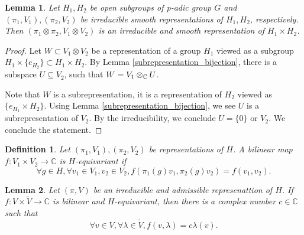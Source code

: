 \documentclass[8pt]{article}
\newtheorem{definition}{Definition}[section]
\newtheorem{lemma}{Lemma}[section]
\newcommand{\C}[0]{\mathbb{C}}
\newcommand{\tens}[1]{%
  \mathbin{\mathop{\otimes}\displaylimits_{#1}}%
}
\begin{document}
\begin{lemma}
  \label{lemma_irreducible_representations_tensor_product}
  Let $H_1,H_2$ be open subgroups of p-adic group $G$ and $(\pi_1,V_1),(\pi_2,V_2)$ be irreducible smooth representations of $H_1,H_2$, respectively.
  Then $(\pi_1\otimes\pi_2,V_1\otimes V_2)$ is an irreducible and smooth representation of $H_1\times H_2$.
\end{lemma}
\begin{proof}
  Let $W\subset V_1\otimes V_2$ be a representation of a group $H_1$ viewed as a subgroup $H_1\times\{e_{H_2}\}\subset H_1\times H_2$. 
  By Lemma \ref{subrepresentation_bijection}, there is a subspace $U\subseteq V_2$, such that $W=V_1\tens{\C}U$.
  \par Note that $W$ is a subrepresentation, it is a representation of $H_2$ viewed as $\{e_{H_1}\times H_2\}$. 
  Using Lemma \ref{subrepresentation_bijection}, we see $U$ is a subrepresentation of $V_2$. By the irreducibility, we conclude $U=\{0\}$ or $V_2$.
  We conclude the statement.
\end{proof}
\begin{definition}
  Let $(\pi_1,V_1),(\pi_2,V_2)$ be representations of $H$. A bilinear map $f:V_1\times V_2\to\C$ is $H$-equivariant if 
  \begin{equation*}
    \forall g\in H,\forall v_1\in V_1,v_2\in V_2, f(\pi_1(g)v_1,\pi_2(g)v_2) = f(v_1,v_2).
  \end{equation*}
\end{definition}
\begin{lemma}
  Let $(\pi,V)$ be an irreducible and admissible represenattion of $H$. If $f:V\times \widetilde{V}\to\C$ is bilinear and $H$-equivariant, then there is a complex number 
  $c\in \C$ such that 
  \begin{equation*}
    \forall v\in V,\forall \lambda\in\widetilde{V}, f(v,\lambda) = c\lambda(v).
  \end{equation*}
  \label{dimension_bilinear_form}
\end{lemma}
\end{document}
